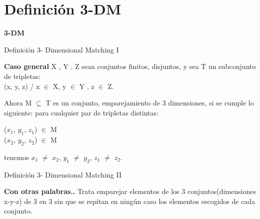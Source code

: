 \documentclass[10pt, mathserif, profesionalfont]{beamer}
\begin{document}
	
	
	
	\section{Definición 3-DM}
	
	\begin{frame}{}
		\begin{center}
			\Huge{\textbf{3-DM}}				
		\end{center}
	\end{frame}
	
	
	\begin{frame}{Definición 3- Dimensional Matching I}
		\begin{block}{\textbf{Caso general}}
			X , Y , Z sean conjuntos finitos, disjuntos, y sea T un subconjunto de tripletas: 
			\\
			(x, y, z) /  x $\in$ X, y $\in$ Y , z $\in$ Z. 
		\end{block}
		
		\begin{block}{}
			Ahora M $\subseteq$ T es un conjunto, emparejamiento de 3 dimensiones, si se cumple lo siguiente: para cualquier par de tripletas distintas:
			
			\begin{center}
				($x_1$, $y_1$, $z_1$) $\in$  M 
				\\ ($x_2$, $y_2$, $z_2$) $\in$ M 
			\end{center}
			
			tenemos $x_1$  $\neq$  $x_2$, $y_1$  $\neq$  $y_2$, $z_1$  $\neq$  $z_2$.
		\end{block}
	\end{frame}
	
	
	\begin{frame}{Definición 3- Dimensional Matching II}
		\begin{block}{\textbf{Con otras palabras..}}
			Trata emparejar elementos de los 3 conjuntos(dimensiones x-y-z) de 3 en 3 sin que se repitan en ningún caso los elementos escogidos de cada conjunto.
		\end{block}
	\end{frame}
	
\end{document}
